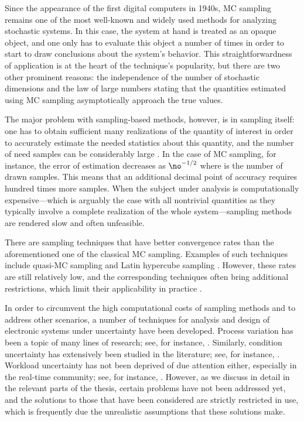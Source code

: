 Since the appearance of the first digital computers in 1940s, \ac{MC} sampling
remains one of the most well-known and widely used methods for analyzing
stochastic systems. In this case, the system at hand is treated as an opaque
object, and one only has to evaluate this object a number of times in order to
start to draw conclusions about the system's behavior. This straightforwardness
of application is at the heart of the technique's popularity, but there are two
other prominent reasons: the independence of the number of stochastic dimensions
and the law of large numbers \cite{durrett2010} stating that the quantities
estimated using \ac{MC} sampling asymptotically approach the true values.

The major problem with sampling-based methods, however, is in sampling itself:
one has to obtain sufficient many realizations of the quantity of interest in
order to accurately estimate the needed statistics about this quantity, and the
number of need samples can be considerably large \cite{diaz-emparanza2002}. In
the case of \ac{MC} sampling, for instance, the error of estimation decreases as
$\no^{-1/2}$ where \no is the number of drawn samples. This means that an
additional decimal point of accuracy requires hundred times more samples. When
the subject under analysis is computationally expensive---which is arguably the
case with all nontrivial quantities as they typically involve a complete
realization of the whole system---sampling methods are rendered slow and often
unfeasible.

There are sampling techniques that have better convergence rates than the
aforementioned one of the classical \ac{MC} sampling. Examples of such
techniques include quasi-\ac{MC} sampling and Latin hypercube sampling
\cite{asmussen2007}. However, these rates are still relatively low, and the
corresponding techniques often bring additional restrictions, which limit their
applicability in practice \cite{xiu2010}.

In order to circumvent the high computational costs of sampling methods and to
address other scenarios, a number of techniques for analysis and design of
electronic systems under uncertainty have been developed. Process variation has
been a topic of many lines of research; see, for instance, \cite{bhardwaj2006,
bhardwaj2008, chandra2010, juan2012, lee2013}. Similarly, condition uncertainty
has extensively been studied in the literature; see, for instance,
\cite{coskun2006, huang2009b, das2014c}. Workload uncertainty has not been
deprived of due attention either, especially in the real-time community; see,
for instance, \cite{diaz2002, santinelli2011, quinton2012, tanasa2015}. However,
as we discuss in detail in the relevant parts of the thesis, certain problems
have not been addressed yet, and the solutions to those that have been
considered are strictly restricted in use, which is frequently due the
unrealistic assumptions that these solutions make.
